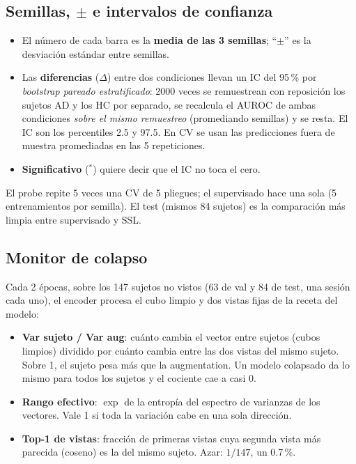 \documentclass[11pt,a4paper]{article}
\begin{document}
\subsection{\texorpdfstring{Semillas, $\pm$ e intervalos de confianza}{Semillas, ± e intervalos de confianza}}

\begin{itemize}
\item El número de cada barra es la \textbf{media de las 3 semillas}; ``$\pm$'' es la desviación
  estándar entre semillas.
\item Las \textbf{diferencias} ($\Delta$) entre dos condiciones llevan un IC del 95\,\% por
  \emph{bootstrap pareado estratificado}: 2000 veces se remuestrean con reposición los sujetos AD y
  los HC por separado, se recalcula el AUROC de ambas condiciones \emph{sobre el mismo remuestreo}
  (promediando semillas) y se resta. El IC son los percentiles 2.5 y 97.5. En CV se usan las
  predicciones fuera de muestra promediadas en las 5 repeticiones.
\item \textbf{Significativo} ($^{*}$) quiere decir que el IC no toca el cero.
\end{itemize}

\begin{warnbox}
El probe repite 5 veces una CV de 5 pliegues; el supervisado hace una sola (5 entrenamientos por
semilla). El test (mismos 84 sujetos) es la comparación más limpia entre supervisado y SSL.
\end{warnbox}

\subsection{Monitor de colapso}
\label{sec:collapsedef}

Cada 2 épocas, sobre los 147 sujetos no vistos (63 de val y 84 de test, una sesión cada uno), el
encoder procesa el cubo limpio y dos vistas fijas de la receta del modelo:
\begin{itemize}
\item \textbf{Var sujeto / Var aug}: cuánto cambia el vector entre sujetos (cubos limpios) dividido
  por cuánto cambia entre las dos vistas del mismo sujeto. Sobre 1, el sujeto pesa más que la
  augmentation. Un modelo colapsado da lo mismo para todos los sujetos y el cociente cae a casi 0.
\item \textbf{Rango efectivo}: $\exp$ de la entropía del espectro de varianzas de los vectores. Vale
  1 si toda la variación cabe en una sola dirección.
\item \textbf{Top-1 de vistas}: fracción de primeras vistas cuya segunda vista más parecida (coseno)
  es la del mismo sujeto. Azar: $1/147$, un 0.7\,\%.
\end{itemize}
\end{document}
